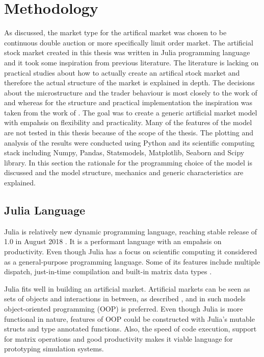 
\section{Methodology}

As discussed, the market type for the artifical market was chosen 
to be continuous double auction or more specifically limit order market.
The artificial stock market created in this thesis was written in Julia
programming language and it took some inspiration from previous literature.
The literature is lacking on practical studies about how to actually create
an artifical stock market and therefore the actual structure of the market is explained
in depth. The decisions about the microstructure and the trader behaviour
is most closely to the work of \citet{Genoa01} and \citet{Raberto05}
whereas for the structure and practical implementation the inspiration
was taken from the work of \citet{Ben12}. The goal was to create a generic artificial market 
model with empahsis on flexibility and practicality. Many of the features
of the model are not tested in this thesis because of the scope of the thesis.
The plotting and analysis of the results were conducted using Python and its scientific
computing stack including Numpy, Pandas, Statsmodels, Matplotlib, Seaborn and Scipy library.
In this section the rationale for the programming choice of the model is discussed
and the model structure, mechanics and generic characteristics are 
explained.


\subsection{Julia Language}
Julia is relatively new dynamic programming language, 
reaching stable release of 1.0 in August 2018 \citep{JuliaV1}.
It is a performant language with an empahsis
on productivity. Even though Julia has a focus on scientific 
computing it considered as a general-purpose programming
language. Some of its features include
multiple dispatch, just-in-time compilation and built-in
matrix data types \citep{Julia}.

Julia fits well in building an artificial market.
Artificial markets can be seen as sets of objects
and interactions in between, as described \citet{Ben12},
and in such models object-oriented programming (OOP)
is preferred. Even though Julia is more functional in nature, 
features of OOP could be constructed with Julia's mutable structs 
and type annotated functions. Also, the speed of code execution, 
support for matrix operations and good productivity makes 
it viable language for prototyping simulation systems. 


